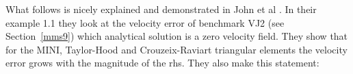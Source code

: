 What follows is nicely explained and demonstrated in John et al \cite{jolm17}. In their 
example 1.1 they look at the velocity error of benchmark VJ2 (see Section~\ref{mms9}) 
which analytical solution is a zero velocity field. They show that for the MINI, 
Taylor-Hood and Crouzeix-Raviart triangular elements the velocity error grows 
with the magnitude of the rhs. They also make this statement:




